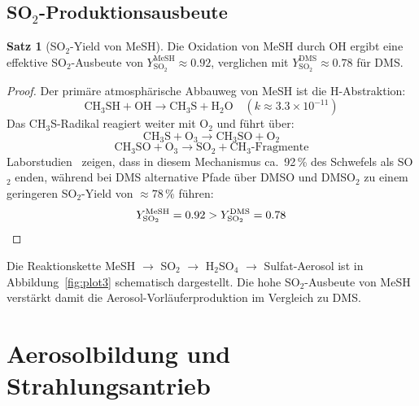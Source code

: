 ﻿\documentclass[a4paper,12pt]{article}
\theoremstyle{definition}
\newtheorem{satz}{Satz}
\begin{document}
\subsection{SO\texorpdfstring{$_2$}{2}-Produktionsausbeute}

\begin{satz}[SO$_2$-Yield von MeSH]
  \label{satz:so2yield}
  Die Oxidation von MeSH durch OH ergibt eine effektive SO$_2$-Ausbeute von
  $Y_{\mathrm{SO_2}}^{\mathrm{MeSH}} \approx 0.92$, verglichen mit
  $Y_{\mathrm{SO_2}}^{\mathrm{DMS}} \approx 0.78$ für DMS.
\end{satz}

\begin{proof}
  Der primäre atmosphärische Abbauweg von MeSH ist die H-Abstraktion:
  \[
    \mathrm{CH_3SH} + \mathrm{OH} \rightarrow \mathrm{CH_3S} + \mathrm{H_2O} \quad (k \approx 3.3 \times 10^{-11})
  \]
  Das CH$_3$S-Radikal reagiert weiter mit O$_2$ und führt über:
  \[
    \mathrm{CH_3S} + \mathrm{O_3} \rightarrow \mathrm{CH_3SO} + \mathrm{O_2}
  \]
  \[
    \mathrm{CH_3SO} + \mathrm{O_3} \rightarrow \mathrm{SO_2} + \text{CH$_3$-Fragmente}
  \]
  Laborstudien~\cite{turnipseed1996, barnes2006} zeigen, dass in diesem Mechanismus ca.~92\,\%
  des Schwefels als SO$_2$ enden, während bei DMS alternative Pfade über DMSO und DMSO$_2$ zu
  einem geringeren SO$_2$-Yield von $\approx 78\,\%$ führen:
  \[
    Y_{\mathrm{SO_2}}^{\mathrm{MeSH}} = 0.92 > Y_{\mathrm{SO_2}}^{\mathrm{DMS}} = 0.78 \qedhere
  \]
\end{proof}

Die Reaktionskette MeSH $\rightarrow$ SO$_2$ $\rightarrow$ H$_2$SO$_4$ $\rightarrow$ Sulfat-Aerosol
ist in Abbildung~\ref{fig:plot3} schematisch dargestellt. Die hohe SO$_2$-Ausbeute von MeSH
verstärkt damit die Aerosol-Vorläuferproduktion im Vergleich zu DMS.

\section{Aerosolbildung und Strahlungsantrieb}
\end{document}
